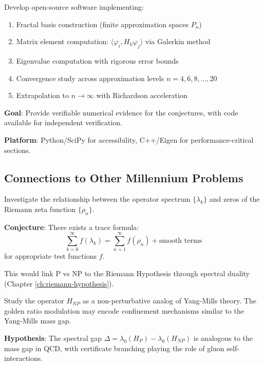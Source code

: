 \begin{problem}\label{prob:reproducibility}
Develop open-source software implementing:
\begin{enumerate}
\item Fractal basis construction (finite approximation spaces $P_n$)
\item Matrix element computation: $\langle \varphi_i, H_V \varphi_j \rangle$ via Galerkin method
\item Eigenvalue computation with rigorous error bounds
\item Convergence study across approximation levels $n = 4, 6, 8, \ldots, 20$
\item Extrapolation to $n \to \infty$ with Richardson acceleration
\end{enumerate}

\textbf{Goal}: Provide verifiable numerical evidence for the conjectures, with code available for independent verification.

\textbf{Platform}: Python/SciPy for accessibility, C++/Eigen for performance-critical sections.
\end{problem}

\subsection{Connections to Other Millennium Problems}

\begin{problem}\label{prob:riemann-connection}
Investigate the relationship between the operator spectrum $\{\lambda_k\}$ and zeros of the Riemann zeta function $\{\rho_n\}$.

\textbf{Conjecture}: There exists a trace formula:
\begin{equation}
\sum_{k=0}^\infty f(\lambda_k) = \sum_{n=1}^\infty f(\rho_n) + \text{smooth terms}
\end{equation}
for appropriate test functions $f$.

This would link P vs NP to the Riemann Hypothesis through spectral duality (Chapter \ref{ch:riemann-hypothesis}).
\end{problem}

\begin{problem}\label{prob:yang-mills-connection}
Study the operator $H_{NP}$ as a non-perturbative analog of Yang-Mills theory. The golden ratio modulation may encode confinement mechanisms similar to the Yang-Mills mass gap.

\textbf{Hypothesis}: The spectral gap $\Delta = \lambda_0(H_P) - \lambda_0(H_{NP})$ is analogous to the mass gap in QCD, with certificate branching playing the role of gluon self-interactions.
\end{problem}

